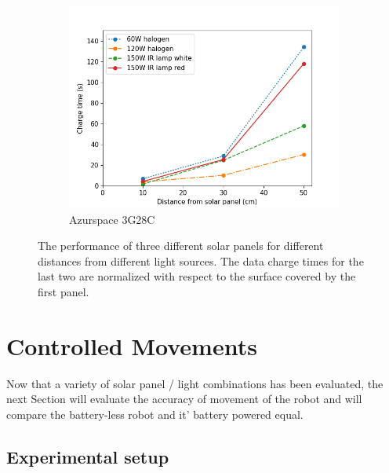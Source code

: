 \begin{figure}
\begin{subfigure}[b]{0.49\textwidth}
		\includegraphics[width=\textwidth]{pics/light_experiment_figure3.png}
		\caption{Azurspace 3G28C}
		\label{fig:light_exp3}
	\end{subfigure}
	\caption{The performance of three different solar panels for different distances from different light sources. The data charge times for the last two are normalized with respect to the surface covered by the first panel.}
\end{figure}

\newpage

\section{Controlled Movements}
\label{sec:controlled_movements}




Now that a variety of solar panel / light combinations has been evaluated, the next Section will evaluate the accuracy of movement of the robot and will compare the battery-less robot and it' battery powered equal.

\subsection{Experimental setup}

